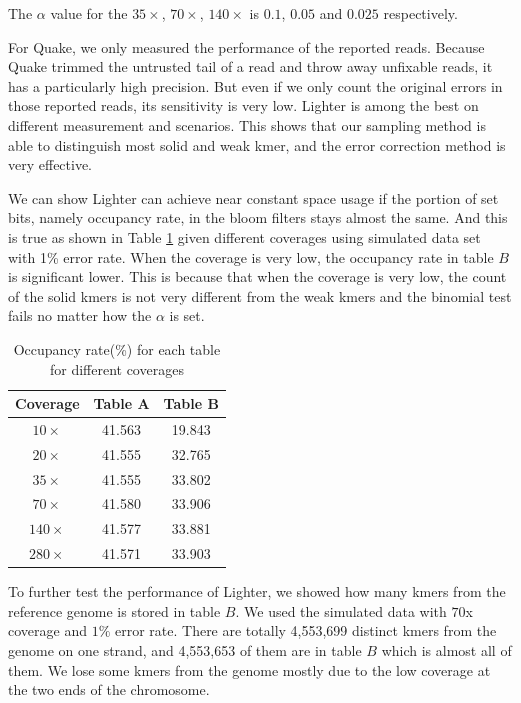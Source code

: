 \documentclass[10pt]{article}
\begin{document}
The $\alpha$ value for the $35\times$, $70\times$, $140\times$ is $0.1$, $0.05$ and $0.025$ respectively. 

For Quake, we only measured the performance of the reported reads. Because Quake trimmed the untrusted tail of a read and throw away unfixable reads, it has a particularly high precision. But even if we only count the original errors in those reported reads, its sensitivity is very low. Lighter is among the best on different measurement and scenarios. This shows that our sampling method is able to distinguish most solid and weak kmer, and the error correction method is very effective.

We can show Lighter can achieve near constant space usage if the portion of set bits, namely occupancy rate, in the bloom filters stays almost the same. And this is true as shown in Table \ref{table:bloom_occupancy_coverage} given different coverages using simulated data set with 1\% error rate. When the coverage is very low, the occupancy rate in table $B$ is significant lower. This is because that when the coverage is very low, the count of the solid kmers is not very different from the weak kmers and the binomial test fails no matter how the $\alpha$ is set.

\begin{table}
\begin{tabular}{|c|c|c|}\hline
Coverage & Table A & Table B \\ \hline
$10\times$	& 41.563  &	19.843 \\ \hline
$20\times$	& 41.555  &	32.765 \\ \hline
$35\times$ & 41.555	& 33.802 \\ \hline
$70\times$ & 41.580	& 33.906 \\ \hline
$140\times$ & 41.577 & 33.881  \\ \hline
$280\times$ & 41.571 & 33.903 \\ \hline
\end{tabular}
\caption{Occupancy rate(\%) for each table for different coverages\label{table:bloom_occupancy_coverage}}
\end{table}

To further test the performance of Lighter, we showed how many kmers from the reference genome is stored in table $B$. We used the simulated data with $70$x coverage and $1\%$ error rate. There are totally 4,553,699 distinct kmers from the genome on one strand, and 4,553,653 of them are in table $B$ which is almost all of them. We lose some kmers from the genome mostly due to the low coverage at the two ends of the chromosome.
\end{document}
